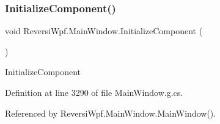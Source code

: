 \subsubsection{\texorpdfstring{Initialize\+Component()}{InitializeComponent()}\hspace{0.1cm}{\footnotesize\ttfamily [1/4]}}
{\footnotesize\ttfamily void Reversi\+Wpf.\+Main\+Window.\+Initialize\+Component (\begin{DoxyParamCaption}{ }\end{DoxyParamCaption})}



Initialize\+Component 



Definition at line 3290 of file Main\+Window.\+g.\+cs.



Referenced by Reversi\+Wpf.\+Main\+Window.\+Main\+Window().

